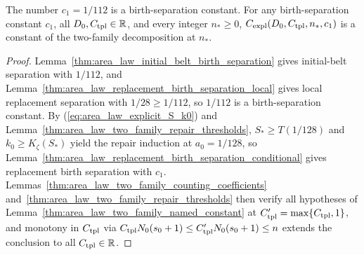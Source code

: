 \begin{theorem}
    \label{thm:area_law_two_family_explicit_constant}
    \leanok
    The number $c_1=1/112$ is a birth-separation constant. For any
    birth-separation constant $c_1$, all $D_0,C_{\rm tpl}\in\mathbb R$, and
    every integer $n_*\ge0$, $C_{\rm expl}(D_0,C_{\rm tpl},n_*,c_1)$ is a
    constant of the two-family decomposition at $n_*$.
\end{theorem}

\begin{proof}
    \leanok
    Lemma~\ref{thm:area_law_initial_belt_birth_separation} gives initial-belt
    separation with $1/112$, and
    Lemma~\ref{thm:area_law_replacement_birth_separation_local} gives local
    replacement separation with $1/28\ge1/112$, so $1/112$ is a
    birth-separation constant. By (\ref{eq:area_law_explicit_S_k0}) and
    Lemma~\ref{thm:area_law_two_family_repair_thresholds}, $S_*\ge T(1/128)$
    and $k_0\ge K_\zeta(S_*)$ yield the repair induction at $a_0=1/128$, so
    Lemma~\ref{thm:area_law_replacement_birth_separation_conditional} gives
    replacement birth separation with $c_1$. Lemmas~\ref{thm:area_law_two_family_counting_coefficients}
    and~\ref{thm:area_law_two_family_repair_thresholds} then verify all
    hypotheses of Lemma~\ref{thm:area_law_two_family_named_constant} at
    $C_{\rm tpl}'=\max\{C_{\rm tpl},1\}$, and monotony in $C_{\rm tpl}$ via
    $C_{\rm tpl}N_0(s_0+1)\le C_{\rm tpl}'N_0(s_0+1)\le n$ extends the
    conclusion to all $C_{\rm tpl}\in\mathbb R$.
\end{proof}
